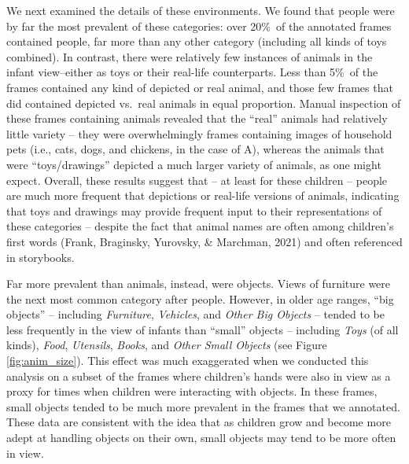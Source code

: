 \documentclass[10pt, letterpaper]{article}
\begin{document}
We next examined the details of these environments. We found that people
were by far the most prevalent of these categories: over 20\%~of the
annotated frames contained people, far more than any other category
(including all kinds of toys combined). In contrast, there were
relatively few instances of animals in the infant view--either as toys
or their real-life counterparts. Less than 5\%~of the frames contained
any kind of depicted or real animal, and those few frames that did
contained depicted vs.~real animals in equal proportion. Manual
inspection of these frames containing animals revealed that the ``real''
animals had relatively little variety -- they were overwhelmingly frames
containing images of household pets (i.e., cats, dogs, and chickens, in
the case of A), whereas the animals that were ``toys/drawings'' depicted
a much larger variety of animals, as one might expect. Overall, these
results suggest that -- at least for these children -- people are much
more frequent that depictions or real-life versions of animals,
indicating that toys and drawings may provide frequent input to their
representations of these categories -- despite the fact that animal
names are often among children's first words (Frank, Braginsky,
Yurovsky, \& Marchman, 2021) and often referenced in storybooks.

Far more prevalent than animals, instead, were objects. Views of
furniture were the next most common category after people. However, in
older age ranges, ``big objects'' -- including \emph{Furniture},
\emph{Vehicles}, and \emph{Other Big Objects} -- tended to be less
frequently in the view of infants than ``small'' objects -- including
\emph{Toys} (of all kinds), \emph{Food}, \emph{Utensils}, \emph{Books},
and \emph{Other Small Objects} (see Figure \ref{fig:anim_size}). This
effect was much exaggerated when we conducted this analysis on a subset
of the frames where children's hands were also in view as a proxy for
times when children were interacting with objects. In these frames,
small objects tended to be much more prevalent in the frames that we
annotated. These data are consistent with the idea that as children grow
and become more adept at handling objects on their own, small objects
may tend to be more often in view.
\end{document}
